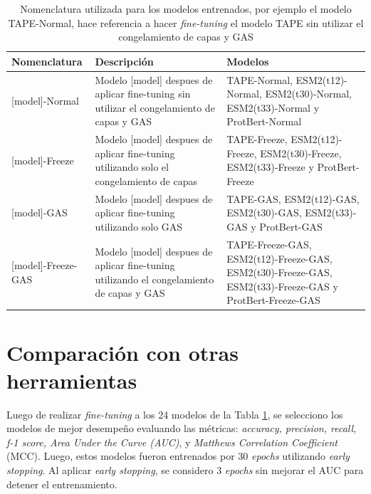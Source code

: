 \begin{table}[H]
	\centering
	\caption[Nomenclatura utilizada para los modelos entrenados.]{Nomenclatura utilizada para los modelos entrenados, por ejemplo el modelo TAPE-Normal, hace referencia a hacer \textit{fine-tuning} el modelo TAPE sin utilizar el congelamiento de capas y GAS}
	\label{tab:cmodel_names}
	
	\small
	\setlength{\tabcolsep}{0.5em} %
	{\renewcommand{\arraystretch}{1.5}%
	\begin{tabular}{lp{5cm}p{5cm}}
		\textbf{Nomenclatura}                 & \textbf{Descripción}       &
		\textbf{Modelos}                                                                             \\ \hline
		{[}model{]}-Normal     & Modelo {[}model{]} despues de aplicar fine-tuning sin utilizar el congelamiento de capas y GAS & TAPE-Normal, ESM2(t12)-Normal, ESM2(t30)-Normal, ESM2(t33)-Normal y ProtBert-Normal \\
		
		{[}model{]}-Freeze     & Modelo {[}model{]} despues de aplicar fine-tuning utilizando solo el congelamiento de capas   & TAPE-Freeze, ESM2(t12)-Freeze, ESM2(t30)-Freeze, ESM2(t33)-Freeze y ProtBert-Freeze \\
		
		{[}model{]}-GAS        & Modelo {[}model{]} despues de aplicar fine-tuning utilizando solo GAS                      & TAPE-GAS, ESM2(t12)-GAS, ESM2(t30)-GAS, ESM2(t33)-GAS y ProtBert-GAS    \\
		
		{[}model{]}-Freeze-GAS & Modelo {[}model{]} despues de aplicar fine-tuning utilizando el congelamiento de capas y GAS  & TAPE-Freeze-GAS, ESM2(t12)-Freeze-GAS, ESM2(t30)-Freeze-GAS, ESM2(t33)-Freeze-GAS y ProtBert-Freeze-GAS
	\end{tabular}
}
\end{table}


\section{Comparación con otras herramientas}

Luego de realizar \textit{fine-tuning} a los 24 modelos de la Tabla \ref{tab:cmodel_names}, se selecciono los modelos de mejor desempeño evaluando las métricas:  \textit{accuracy, precision, recall, f-1 score, Area Under the Curve (AUC)}, y \textit{Matthews Correlation Coefficient} (MCC). Luego, estos modelos fueron entrenados por 30 \textit{epochs} utilizando \textit{early stopping}. Al aplicar \textit{early stopping}, se considero 3 \textit{epochs} sin mejorar el AUC para detener el entrenamiento. 

